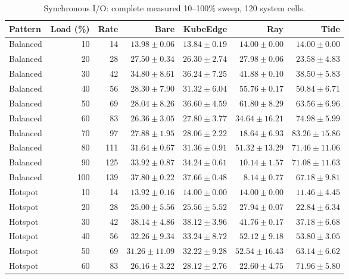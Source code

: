 \begin{table}[htbp]\centering\small
\caption{Synchronous I/O: complete measured 10--100\% sweep, 120 system cells.}
\label{tab:fig6-sweep-io}
\begin{tabular*}{\linewidth}{@{\extracolsep{\fill}}lrrrrrr}
\toprule Pattern & Load (\%) & Rate & Bare & KubeEdge & Ray & Tide\\\midrule
Balanced & 10 & 14 & $13.98 \pm 0.06$ & $13.84 \pm 0.19$ & $14.00 \pm 0.00$ & $14.00 \pm 0.00$\\
Balanced & 20 & 28 & $27.50 \pm 0.34$ & $26.30 \pm 2.74$ & $27.98 \pm 0.06$ & $23.58 \pm 4.83$\\
Balanced & 30 & 42 & $34.80 \pm 8.61$ & $36.24 \pm 7.25$ & $41.88 \pm 0.10$ & $38.50 \pm 5.83$\\
Balanced & 40 & 56 & $28.30 \pm 7.90$ & $31.32 \pm 6.04$ & $55.76 \pm 0.17$ & $50.84 \pm 6.71$\\
Balanced & 50 & 69 & $28.04 \pm 8.26$ & $36.60 \pm 4.59$ & $61.80 \pm 8.29$ & $63.56 \pm 6.96$\\
Balanced & 60 & 83 & $26.36 \pm 3.05$ & $27.80 \pm 3.77$ & $34.64 \pm 16.21$ & $74.98 \pm 5.99$\\
Balanced & 70 & 97 & $27.88 \pm 1.95$ & $28.06 \pm 2.22$ & $18.64 \pm 6.93$ & $83.26 \pm 15.86$\\
Balanced & 80 & 111 & $31.64 \pm 0.67$ & $31.36 \pm 0.91$ & $51.32 \pm 13.29$ & $71.46 \pm 11.06$\\
Balanced & 90 & 125 & $33.92 \pm 0.87$ & $34.24 \pm 0.61$ & $10.14 \pm 1.57$ & $71.08 \pm 11.63$\\
Balanced & 100 & 139 & $37.80 \pm 0.22$ & $37.66 \pm 0.48$ & $8.14 \pm 0.77$ & $67.18 \pm 9.81$\\
\midrule
Hotspot & 10 & 14 & $13.92 \pm 0.16$ & $14.00 \pm 0.00$ & $14.00 \pm 0.00$ & $11.46 \pm 4.45$\\
Hotspot & 20 & 28 & $25.00 \pm 5.56$ & $25.56 \pm 5.52$ & $27.94 \pm 0.07$ & $22.84 \pm 6.34$\\
Hotspot & 30 & 42 & $38.14 \pm 4.86$ & $38.12 \pm 3.96$ & $41.76 \pm 0.17$ & $37.18 \pm 6.68$\\
Hotspot & 40 & 56 & $32.26 \pm 9.34$ & $33.24 \pm 8.72$ & $52.12 \pm 9.18$ & $53.80 \pm 3.05$\\
Hotspot & 50 & 69 & $31.26 \pm 11.09$ & $32.22 \pm 9.28$ & $52.54 \pm 16.43$ & $63.14 \pm 6.62$\\
Hotspot & 60 & 83 & $26.16 \pm 3.22$ & $28.12 \pm 2.76$ & $22.60 \pm 4.75$ & $71.96 \pm 5.80$\\

\end{tabular*}
\end{table}
